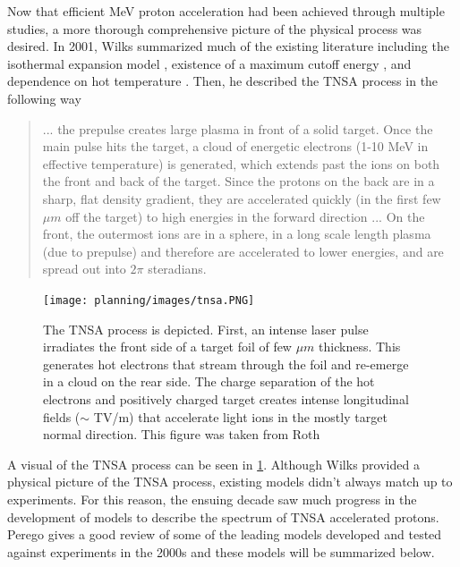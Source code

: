 Now that efficient MeV proton acceleration had been achieved through multiple studies, a more thorough comprehensive picture of the physical process was desired. In 2001, Wilks \cite{Wilks_2001_PoP} summarized much of the existing literature including the isothermal expansion model \cite{Crow_1975_JPP}, existence of a maximum cutoff energy \cite{Kishimoto_1983_PoF}, and dependence on hot temperature \cite{Wilks_1992_PRL}. Then, he described the \gls{TNSA} process in the following way \cite{Wilks_2001_PoP}

\begin{quote}
	... the prepulse creates large plasma in front of a solid target. Once the main pulse hits the target, a cloud of energetic electrons (1-10 MeV in effective temperature) is generated, which extends past the ions on both the front and back of the target. Since the protons on the back are in a sharp, flat density gradient, they are accelerated quickly (in the first few $\mu m$ off the target) to high energies in the forward direction ... On the front, the outermost ions are in a sphere, in a long scale length plasma (due to prepulse) and therefore are accelerated to lower energies, and are spread out into $2 \pi$ steradians.
\end{quote}

\begin{figure}
	\centering 
	\texttt{[image: planning/images/tnsa.PNG]}
	\caption{The \gls{TNSA} process is depicted. First, an intense laser pulse irradiates the front side of a target foil of few $\mu m$ thickness. This generates hot electrons that stream through the foil and re-emerge in a cloud on the rear side. The charge separation of the hot electrons and positively charged target creates intense longitudinal fields ($\sim$ TV/m) that accelerate light ions in the mostly target normal direction. This figure was taken from Roth \cite{Roth_2016_CERN_TNSA}}
	\label{fig:tnsa}
\end{figure}

A visual of the \gls{TNSA} process can be seen in \cref{fig:tnsa}. Although Wilks \cite{Wilks_2001_PoP} provided a physical picture of the \gls{TNSA} process, existing models didn't always match up to experiments. For this reason, the ensuing decade saw much progress in the development of models to describe the spectrum of \gls{TNSA} accelerated protons. Perego \cite{Perego_2011_NIaMiP} gives a good review of some of the leading models developed and tested against experiments in the 2000s and these models will be summarized below. 

